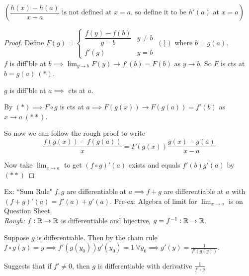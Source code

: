 $\left(\dfrac{h(x) - h(a)}{x-a} \text{ is not defined at } x=a \text{, so define it to be } h'(a) \text{ at } x=a \right)$\\

\begin{proof}
Define $F(g) = \begin{cases}
 	\dfrac{f(y)-f(b)}{g-b} & y \neq b\\
 	f'(g) &  y = b 
 \end{cases}~(\ddagger)$
 where $b = g(a)$. \vspace*{5pt}\\$f$ is diff'ble at $b \implies \lim_{y \to b} F(y) \to f'(b) = F(b)$ as $y \to b$. So $F$ is cts at $b = g(a) ~(*)$. 
 
 $g$ is diff'ble at $a \implies$ cts at $a$. 
 
 By $(*) \implies F \circ g$ is cts at $a \implies F(g(x)) \to F(g(a)) = f'(b)$ as $x \to a ~(**)$. 
 
 So now we can follow the rough proof to write 
 \[\frac{f(g(x)) -f(g(a))}{x} = F(g(x))\frac{g(x) - g(a)}{x-a}\]
 

 
 Now take $\lim_{x\to a}$ to get $(f\circ g)'(a)$ exists and equals $f'(b)g'(a)$ by $(**)$ \end{proof}\vspace*{5pt}
 
 Ex: ``Sum Rule" $f, g$ are differentiable at $a\implies f+g$ are differentiable at $a$ with $(f+g)'(a) = f'(a) + g'(a)$. Pre-ex: Algebra of limit for $\lim_{x\to a}$ is on Question Sheet.\\
 
 \emph{Rough:} $f: \mathbb{R}\to \mathbb{R}$ is differentiable and bijective, $g = f^{-1}: \mathbb{R} \to \mathbb{R}$.
 
  Suppose $g$ is differentiable. Then by the chain rule $f\circ g(y) = y \implies f'(g(y_0))g'(y_0) = 1~\forall y_0 \implies g'(y) = \frac{1}{f'(g(y))}$. 
  
  Suggests that if $f' \neq 0$, then $g$ is differentiable with derivative $\frac{1}{f'\circ g}$\vspace*{5pt}

